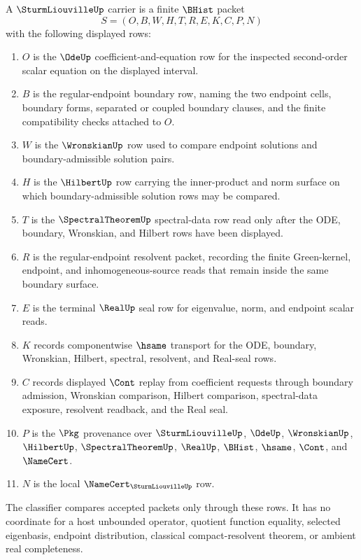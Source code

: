 \begin{definition}
\label{def:sturm-liouville-carrier}
A $\SturmLiouvilleUp$ carrier is a finite $\BHist$ packet
$$
S=(O,B,W,H,T,R,E,K,C,P,N)
$$
with the following displayed rows:
\begin{enumerate}
\item $O$ is the $\OdeUp$ coefficient-and-equation row for the inspected second-order scalar equation on the displayed interval.
\item $B$ is the regular-endpoint boundary row, naming the two endpoint cells, boundary forms, separated or coupled boundary clauses, and the finite compatibility checks attached to $O$.
\item $W$ is the $\WronskianUp$ row used to compare endpoint solutions and boundary-admissible solution pairs.
\item $H$ is the $\HilbertUp$ row carrying the inner-product and norm surface on which boundary-admissible solution rows may be compared.
\item $T$ is the $\SpectralTheoremUp$ spectral-data row read only after the ODE, boundary, Wronskian, and Hilbert rows have been displayed.
\item $R$ is the regular-endpoint resolvent packet, recording the finite Green-kernel, endpoint, and inhomogeneous-source reads that remain inside the same boundary surface.
\item $E$ is the terminal $\RealUp$ seal row for eigenvalue, norm, and endpoint scalar reads.
\item $K$ records componentwise $\hsame$ transport for the ODE, boundary, Wronskian, Hilbert, spectral, resolvent, and Real-seal rows.
\item $C$ records displayed $\Cont$ replay from coefficient requests through boundary admission, Wronskian comparison, Hilbert comparison, spectral-data exposure, resolvent readback, and the Real seal.
\item $P$ is the $\Pkg$ provenance over $\SturmLiouvilleUp$, $\OdeUp$, $\WronskianUp$, $\HilbertUp$, $\SpectralTheoremUp$, $\RealUp$, $\BHist$, $\hsame$, $\Cont$, and $\NameCert$.
\item $N$ is the local $\NameCert_{\SturmLiouvilleUp}$ row.
\end{enumerate}
The classifier compares accepted packets only through these rows. It has no coordinate for a host unbounded operator, quotient function equality, selected eigenbasis, endpoint distribution, classical compact-resolvent theorem, or ambient real completeness.
\end{definition}

